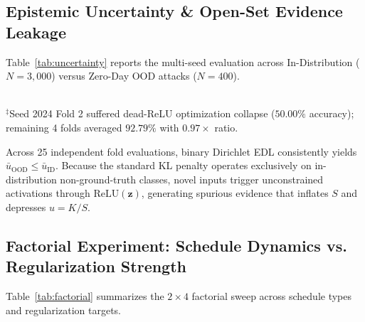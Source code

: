 \documentclass[conference]{IEEEtran}
\begin{document}
\subsection{Epistemic Uncertainty \& Open-Set Evidence Leakage}
Table~\ref{tab:uncertainty} reports the multi-seed evaluation across In-Distribution ($N=3,000$) versus Zero-Day OOD attacks ($N=400$).

\begin{table}[htbp]
\caption{Multi-Seed Uncertainty Replication Study on Quishing (5 Seeds $\times$ 5 Folds)}
\label{tab:uncertainty}
\centering
{}
\vspace{1mm}
\\
\footnotesize{$^\ddagger$Seed 2024 Fold 2 suffered dead-ReLU optimization collapse ($50.00\%$ accuracy); remaining 4 folds averaged $92.79\%$ with $0.97\times$ ratio.}
\end{table}

Across 25 independent fold evaluations, binary Dirichlet EDL consistently yields $\bar{u}_{\text{OOD}} \le \bar{u}_{\text{ID}}$. Because the standard KL penalty operates exclusively on in-distribution non-ground-truth classes, novel inputs trigger unconstrained activations through $\text{ReLU}(\mathbf{z})$, generating spurious evidence that inflates $S$ and depresses $u = K/S$.

\subsection{Factorial Experiment: Schedule Dynamics vs. Regularization Strength}
Table~\ref{tab:factorial} summarizes the $2 \times 4$ factorial sweep across schedule types and regularization targets.
\end{document}
